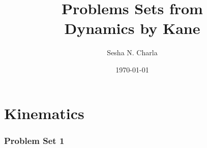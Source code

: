 \documentclass[letterpaper, 11pt]{article}
\title{Problems Sets from\\Dynamics by Kane}
\author{Sesha N. Charla}
\date{\today}
\begin{document}
\maketitle
\tableofcontents
\newpage
\part{Kinematics}
\section{Problem Set 1}








\end{document}
